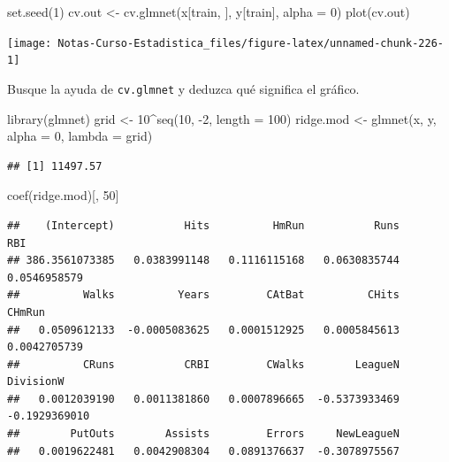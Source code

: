 \documentclass[
  12pt,
]{book}
\newenvironment{Shaded}{\begin{snugshade}}{\end{snugshade}}
\newcommand{\AttributeTok}[1]{\textcolor[rgb]{0.77,0.63,0.00}{#1}}
\newcommand{\DecValTok}[1]{\textcolor[rgb]{0.00,0.00,0.81}{#1}}
\newcommand{\FunctionTok}[1]{\textcolor[rgb]{0.00,0.00,0.00}{#1}}
\newcommand{\NormalTok}[1]{#1}
\newcommand{\OtherTok}[1]{\textcolor[rgb]{0.56,0.35,0.01}{#1}}
\newcommand{\SpecialCharTok}[1]{\textcolor[rgb]{0.00,0.00,0.00}{#1}}
\theoremstyle{definition}
\theoremstyle{definition}
\theoremstyle{definition}
\theoremstyle{definition}
\theoremstyle{remark}
\begin{document}
\begin{Shaded}
\begin{Highlighting}[]
\FunctionTok{set.seed}\NormalTok{(}\DecValTok{1}\NormalTok{)}
\NormalTok{cv.out }\OtherTok{\textless{}{-}} \FunctionTok{cv.glmnet}\NormalTok{(x[train, ], y[train], }\AttributeTok{alpha =} \DecValTok{0}\NormalTok{)}
\FunctionTok{plot}\NormalTok{(cv.out)}
\end{Highlighting}
\end{Shaded}

\begin{center}\texttt{[image: Notas-Curso-Estadistica\_files/figure-latex/unnamed-chunk-226-1]} \end{center}

Busque la ayuda de \texttt{cv.glmnet} y deduzca qué significa el gráfico.

\begin{Shaded}
\begin{Highlighting}[]
\FunctionTok{library}\NormalTok{(glmnet)}
\NormalTok{grid }\OtherTok{\textless{}{-}} \DecValTok{10}\SpecialCharTok{\^{}}\FunctionTok{seq}\NormalTok{(}\DecValTok{10}\NormalTok{, }\SpecialCharTok{{-}}\DecValTok{2}\NormalTok{, }\AttributeTok{length =} \DecValTok{100}\NormalTok{)}
\NormalTok{ridge.mod }\OtherTok{\textless{}{-}} \FunctionTok{glmnet}\NormalTok{(x, y, }\AttributeTok{alpha =} \DecValTok{0}\NormalTok{, }\AttributeTok{lambda =}\NormalTok{ grid)}
\end{Highlighting}
\end{Shaded}

\begin{Shaded}
\end{Shaded}

\begin{verbatim}
## [1] 11497.57
\end{verbatim}

\begin{Shaded}
\begin{Highlighting}[]
\FunctionTok{coef}\NormalTok{(ridge.mod)[, }\DecValTok{50}\NormalTok{]}
\end{Highlighting}
\end{Shaded}

\begin{verbatim}
##    (Intercept)           Hits          HmRun           Runs            RBI 
## 386.3561073385   0.0383991148   0.1116115168   0.0630835744   0.0546958579 
##          Walks          Years         CAtBat          CHits         CHmRun 
##   0.0509612133  -0.0005083625   0.0001512925   0.0005845613   0.0042705739 
##          CRuns           CRBI         CWalks        LeagueN      DivisionW 
##   0.0012039190   0.0011381860   0.0007896665  -0.5373933469  -0.1929369010 
##        PutOuts        Assists         Errors     NewLeagueN 
##   0.0019622481   0.0042908304   0.0891376637  -0.3078975567
\end{verbatim}
\end{document}
